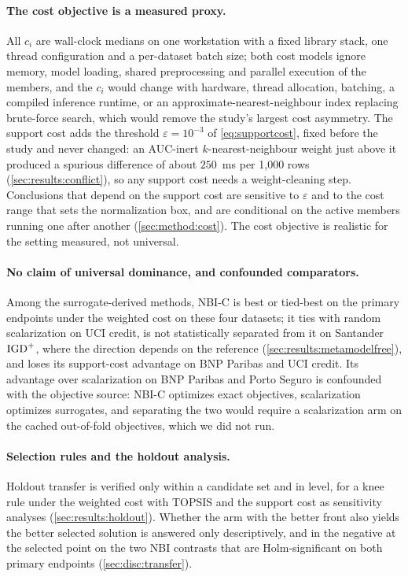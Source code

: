 \paragraph{The cost objective is a measured proxy.} All $c_i$ are wall-clock medians on one workstation with a fixed
library stack, one thread configuration and a per-dataset batch size; both cost models ignore memory, model loading,
shared preprocessing and parallel execution of the members, and the $c_i$ would change with hardware, thread
allocation, batching, a compiled inference runtime, or an approximate-nearest-neighbour index replacing brute-force
search, which would remove the study's largest cost asymmetry. The support cost adds the threshold
$\varepsilon = 10^{-3}$ of \cref{eq:supportcost}, fixed before the study and never changed: an AUC-inert
$k$-nearest-neighbour weight just above it produced a spurious difference of about $250$~ms per 1{,}000 rows
(\cref{sec:results:conflict}), so any support cost needs a weight-cleaning step. Conclusions that depend on the
support cost are sensitive to $\varepsilon$ and to the cost range that sets the normalization box, and are
conditional on the active members running one after another (\cref{sec:method:cost}). The cost objective is realistic
for the setting measured, not universal.

\paragraph{No claim of universal dominance, and confounded comparators.} Among the surrogate-derived methods, NBI-C is
best or tied-best on the primary endpoints under the weighted cost on these four datasets; it ties with random
scalarization on UCI credit, is not statistically separated from it on Santander $\mathrm{IGD}^{+}$, where the direction depends
on the reference (\cref{sec:results:metamodelfree}), and loses its support-cost advantage on BNP Paribas and UCI
credit. Its advantage over scalarization on BNP Paribas and Porto Seguro is confounded with the objective source:
NBI-C optimizes exact objectives, scalarization optimizes surrogates, and separating the two would require a
scalarization arm on the cached out-of-fold objectives, which we did not run.

\paragraph{Selection rules and the holdout analysis.} Holdout transfer is verified only within a candidate set and in
level, for a knee rule under the weighted cost with TOPSIS and the support cost as sensitivity analyses
(\cref{sec:results:holdout}). Whether the arm with the better front also yields the better selected solution is
answered only descriptively, and in the negative at the selected point on the two NBI contrasts that are
Holm-significant on both primary endpoints (\cref{sec:disc:transfer}).
